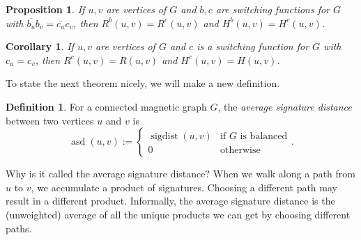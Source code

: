 \documentclass[12pt]{article}
\newtheorem{prop}[thm]{Proposition}
\newtheorem{corollary}[thm]{Corollary}
\theoremstyle{definition}
\newtheorem{defn}[thm]{Definition}
\DeclareMathOperator{\sigdist}{sigdist}
\DeclareMathOperator{\asd}{asd}
\begin{document}
\begin{prop}
If $u, v$ are vertices of $G$ and $b, c$ are switching functions for $G$ with $\overline{b_u}b_v = \overline{c_u}c_v$, then $R^b (u, v) = R^c (u, v)$ and $H^b (u, v) = H^c (u, v)$.
\end{prop}

\begin{corollary}
If $u, v$ are vertices of $G$ and $c$ is a switching function for $G$ with $c_u = c_v$, then $R^c (u, v) = R(u, v)$ and $H^c (u, v) = H(u, v)$.  
\end{corollary}

To state the next theorem nicely, we will make a new definition.   
\begin{defn}
For a connected magnetic graph $G$, the \textit{average signature distance} between two vertices $u$ and $v$ is
$$
\asd(u, v) := \begin{cases}
\sigdist(u, v) &\mbox{if $G$ is balanced} \\
0 &\mbox{otherwise}
\end{cases}.
$$
\end{defn}
Why is it called the average signature distance? When we walk along a path from $u$ to $v$, we accumulate a product of signatures. Choosing a different path may result in a different product. Informally, the average signature distance is the (unweighted) average of all the unique products we can get by choosing different paths.
\end{document}
